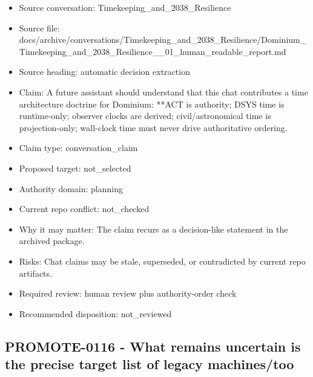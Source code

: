 \documentclass[11pt,a4paper]{report}
\begin{document}
\begin{itemize}
\item Source conversation: Timekeeping\_and\_2038\_Resilience
\item Source file: docs/archive/conversations/Timekeeping\_and\_2038\_Resilience/Dominium\_Timekeeping\_and\_2038\_Resilience\_\_01\_human\_readable\_report.md
\item Source heading: automatic decision extraction
\item Claim: A future assistant should understand that this chat contributes a time architecture doctrine for Dominium: **ACT is authority; DSYS time is runtime-only; observer clocks are derived; civil/astronomical time is projection-only; wall-clock time must never drive authoritative ordering.
\item Claim type: conversation\_claim
\item Proposed target: not\_selected
\item Authority domain: planning
\item Current repo conflict: not\_checked
\item Why it may matter: The claim recurs as a decision-like statement in the archived package.
\item Risks: Chat claims may be stale, superseded, or contradicted by current repo artifacts.
\item Required review: human review plus authority-order check
\item Recommended disposition: not\_reviewed
\end{itemize}

\subsection{PROMOTE-0116 - What remains uncertain is the precise target list of legacy machines/too}
\end{document}
